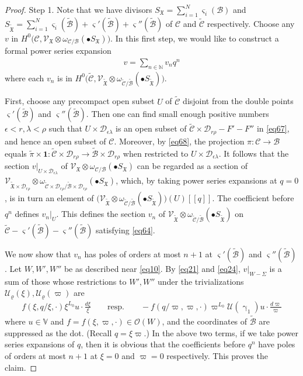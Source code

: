 \documentclass[11pt,b5paper,notitlepage]{article}
\theoremstyle{definition}
\theoremstyle{plain}
\newcommand{\fk}{\mathfrak}
\newcommand{\mc}{\mathcal}
\newcommand{\wtd}{\widetilde}
\newcommand{\id}{\mathbf{1}}
\newcommand{\scr}{\mathscr}
\newcommand{\sgm}{\varsigma}
\newcommand{\blt}{\bullet}
\newcommand{\Vbb}{\mathbb V}
\newcommand{\Nbb}{\mathbb N}
\numberwithin{equation}{section}
\begin{document}
\begin{proof}
	Step 1. Note that we have divisors $S_{\fk X}=\sum_{i=1}^N\sgm_i(\mc B)$ and $S_{\wtd{\fk X}}=\sum_{i=1}^N\sgm_i(\wtd{\mc B})+\sgm'(\wtd{\mc B})+\sgm''(\wtd{\mc B})$ of $\mc C$ and $\wtd{\mc C}$ respectively. Choose any $v$ in $H^0\big(\mc C,\scr V_{\fk X}\otimes\omega_{\mc C/\mc B}(\blt S_{\fk X})\big)$.  In this first step, we would like to construct a formal power series expansion
	\begin{align}
	v=\sum_{n\in\Nbb}v_{n}q^n\label{eq64}
	\end{align}
	where each $v_{n}$ is in $H^0\big(\wtd{\mc C},\scr V_{\wtd{\fk X}}\otimes\omega_{\wtd{\mc C}/\wtd{\mc B}}(\blt S_{\wtd{\fk X}})\big)$.  
	
	First, choose any precompact open subset $U$ of $\wtd{\mc C}$ disjoint from the double points $\sgm'(\wtd{\mc B})$ and $\sgm''(\wtd{\mc B})$. Then  one can find small enough positive numbers $\epsilon<r,\lambda<\rho$  such that $U\times\mc D_{\epsilon\lambda}$ is an open subset of  $\wtd {\mc C}\times\mc D_{r\rho}- F'-F''$ in \eqref{eq67}, and hence an open subset of $\mc C$.   Moreover, by \eqref{eq68}, the projection $\pi:\mc C\rightarrow\mc B$ equals $\wtd \pi\times \id:\wtd {\mc C}\times\mc D_{r\rho}\rightarrow \wtd{\mc B}\times \mc D_{r\rho}$ when restricted to  $U\times \mc D_{\epsilon\lambda}$. It follows that the section $v|_{U\times \mc D_{\epsilon\lambda}}$  of $\scr V_{\fk X}\otimes\omega_{\mc C/\mc B}(\blt S_{\fk X})$ can be regarded as a section of $\scr V_{\wtd{\fk X}\times\mc D_{r\rho}}\otimes\omega_{\wtd{\mc C}\times\mc D_{r\rho}/\wtd{\mc B}\times\mc D_{r\rho}}(\blt S_{\fk X})$, which, by taking power series expansions at $q=0$, is in turn an element of $\big(\scr V_{\wtd{\fk X}}\otimes\omega_{\wtd{\mc C}/\wtd{\mc B}}(\blt S_{\wtd{\fk X}})\big)(U)[[q]]$. The coefficient before $q^{n}$ defines $v_{n}|_{U}$. This defines the section $v_{n}$ of $\scr V_{\wtd{\fk X}}\otimes\omega_{\wtd{\mc C}/\wtd{\mc B}}(\blt S_{\wtd{\fk X}})$ on $\wtd{\mc C}-\sgm'(\wtd{\mc B})- \sgm''(\wtd{\mc B})$ satisfying \eqref{eq64}.
	
	We now show that $v_{n}$ has poles of orders at most $n+1$ at $\sgm'(\wtd{\mc B})$ and $\sgm''(\wtd{\mc B})$. Let $W,W',W''$ be as described near \eqref{eq10}. By \eqref{eq21} and \eqref{eq24}, $v|_{W-\Sigma}$ is a sum of those whose restrictions to $W',W''$  under the trivializations $\mc U_\varrho(\xi),\mc U_\varrho(\varpi)$ are
	\begin{align}
	f(\xi,q/\xi,\cdot)\xi^{L_0}u\cdot \frac{d\xi}{\xi}  \qquad\text{resp.}\qquad -f(q/\varpi,\varpi,\cdot)\varpi^{L_0}\mc U(\upgamma_1)u\cdot \frac{d\varpi}{\varpi}\label{eq65}
	\end{align}
	where $u\in\Vbb$ and $f=f(\xi,\varpi,\cdot)\in\scr O(W)$, and the coordinates of $\wtd {\mc B}$ are suppressed as the dot. (Recall $q=\xi\varpi$.) In the above two terms, if we take power series expansions of $q$, then it is obvious that the coefficients before  $q^{n}$ have poles of orders at most $n+1$ at $\xi=0$ and $\varpi=0$ respectively. This proves the claim.
	

\end{proof}
\end{document}
